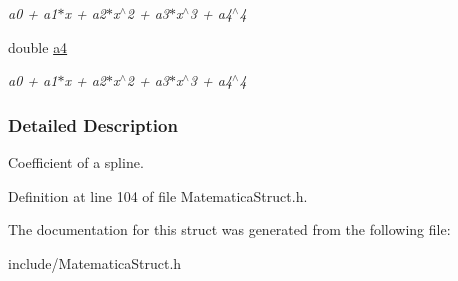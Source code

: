 \begin{DoxyCompactItemize}
\begin{DoxyCompactList}\small\item\em a0 + a1$\ast$x + a2$\ast$x$^\wedge$2 + a3$\ast$x$^\wedge$3 + a4$^\wedge$4 \end{DoxyCompactList}\item 
double \hyperlink{structSPLINE_ac6ef178808a2e015c97d93c99e52a441}{a4}\hypertarget{structSPLINE_ac6ef178808a2e015c97d93c99e52a441}{}\label{structSPLINE_ac6ef178808a2e015c97d93c99e52a441}

\begin{DoxyCompactList}\small\item\em a0 + a1$\ast$x + a2$\ast$x$^\wedge$2 + a3$\ast$x$^\wedge$3 + a4$^\wedge$4 \end{DoxyCompactList}\end{DoxyCompactItemize}


\subsubsection{Detailed Description}
Coefficient of a spline. 

Definition at line 104 of file Matematica\+Struct.\+h.



The documentation for this struct was generated from the following file\+:\begin{DoxyCompactItemize}
\item 
include/Matematica\+Struct.\+h\end{DoxyCompactItemize}
